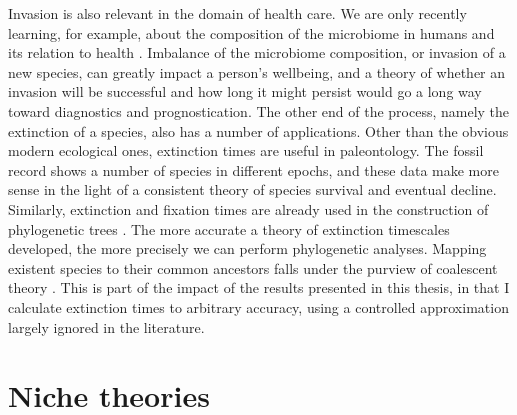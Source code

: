 Invasion is also relevant in the domain of health care. 
We are only recently learning, for example, about the composition of the microbiome in humans and its relation to health \cite{Coburn2015,Korem2015,Manichanh2010,Theriot2014,Kinross2011}. 
Imbalance of the microbiome composition, or invasion of a new species, can greatly impact a person's wellbeing, and a theory of whether an invasion will be successful and how long it might persist would go a long way toward diagnostics and prognostication.
The other end of the process, namely the extinction of a species, also has a number of applications. 
Other than the obvious modern ecological ones, extinction times are useful in paleontology. 
The fossil record shows a number of species in different epochs, and these data make more sense in the light of a consistent theory of species survival and eventual decline. %
Similarly, extinction and fixation times are already used in the construction of phylogenetic trees \cite{Rogers2014,Rice2004,Blythe2007}. 
The more accurate a theory of extinction timescales developed, the more precisely we can perform phylogenetic analyses. 
Mapping existent species to their common ancestors falls under the purview of coalescent theory \cite{Kingman1982}. %
This is part of the impact of the results presented in this thesis, in that I calculate extinction times to arbitrary accuracy, using a controlled approximation largely ignored in the literature. 






\section{Niche theories}

